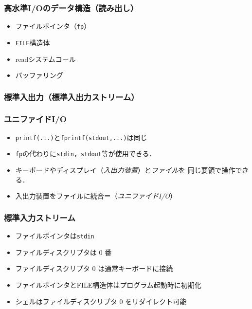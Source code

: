 \documentclass{beamer}                 %
\begin{document}
\begin{frame}
  \frametitle{高水準I/Oのデータ構造（読み出し）}
  \begin{itemize}
  \item ファイルポインタ（\texttt{fp}）
  \item \texttt{FILE}構造体
  \item readシステムコール
  \item バッファリング
  \end{itemize}
\end{frame}

\begin{frame}
  \frametitle{標準入出力（標準入出力ストリーム）}
\end{frame}

\begin{frame}
  \frametitle{ユニファイドI/O}
  \begin{itemize}
  \item \texttt{printf(...)}と\texttt{fprintf(stdout,...)}は同じ
  \item \texttt{fp}の代わりに\texttt{stdin}，\texttt{stdout}等が使用できる．
  \item キーボードやディスプレイ（\emph{入出力装置}）と\emph{ファイル}を
    同じ要領で操作できる．
  \item 入出力装置をファイルに統合＝（\emph{ユニファイドI/O}）
  \end{itemize}
\end{frame}

\begin{frame}
  \frametitle{標準入力ストリーム}
  \begin{itemize}
  \item ファイルポインタは\texttt{stdin}
  \item ファイルディスクリプタは 0 番
  \item ファイルディスクリプタ 0 は通常キーボードに接続
  \item ファイルポインタとFILE構造体はプログラム起動時に初期化
  \item シェルはファイルディスクリプタ 0 をリダイレクト可能
  \end{itemize}
\end{frame}
\end{document}
